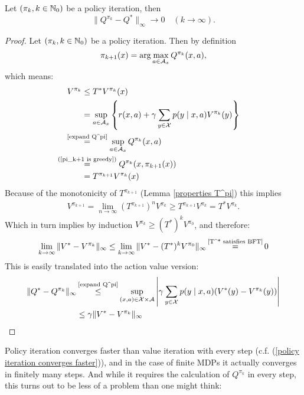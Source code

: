 \begin{prop}
	Let \((\pi_k,k\in\mathbb{N}_0)\) be a policy iteration, then
	\[\|Q^{\pi_k}-Q^*\|_\infty \to 0 \quad (k\to\infty). \] 
\end{prop}
\begin{proof}
	Let \((\pi_k,k\in\mathbb{N}_0)\) be a policy iteration. Then by definition
	\begin{align}\label{pi_k+1 is greedy}
		\pi_{k+1}(x)=\arg\max_{a\in\mathcal{A}_x} Q^{\pi_k}(x,a),
	\end{align}
	which means:
	\begin{align}
		V^{\pi_k} &\le T^* V^{\pi_k}(x)
		\label{real improvement or optimal}\\
		&=\sup_{a\in\cA_x}\left\{r(x,a)+\gamma \sum_{y\in\cX}p(y\mid x,a)V^{\pi_k}(y) \right\}
		\nonumber\\
		&\lxeq{\text{\ref{expand Q^pi}}}\sup_{a\in\cA_x}Q^{\pi_k}(x,a)
		\nonumber\\
		&\lxeq{\text{(\ref{pi_k+1 is greedy})} }Q^{\pi_k}(x,\pi_{k+1}(x))
		\nonumber\\
		&=T^{\pi_{k+1}}V^{\pi_k}(x)
		\nonumber
	\end{align}
	Because of the monotonicity of \(T^{\pi_{k+1}}\) (Lemma \ref{properties T^pi}) this implies
	\begin{align}\label{policy iteration converges faster}
		V^{\pi_{k+1}}=\lim_{n\to\infty}(T^{\pi_{k+1}})^n V^{\pi_k}
		\ge T^{\pi_{k+1}} V^{\pi_k} 
		= T^* V^{\pi_k}.
	\end{align}
	Which in turn implies by induction \(V^{\pi_{k}} \ge (T^*)^k V^{\pi_0}\), and therefore:
	\begin{align*}
		\lim_{k\to\infty} \|V^* - V^{\pi_k}\|_\infty 
		\le \lim_{k\to\infty} \|V^* - (T^*)^k V^{\pi_0}\|_\infty 
		\xeq{\text{\ref{T^* satisfies BFT}}} 0
	\end{align*}
	This is easily translated into the action value version:
	\begin{align*}
		\|Q^* - Q^{\pi_k}\|_\infty &\xlq{\text{\ref{expand Q^pi}}} \sup_{(x,a)\in\cX\times\cA} \left| 
			\gamma \sum_{y\in\cX}p(y\mid x,a) (V^*(y)- V^{\pi_k}(y))
		\right|\\
		&\le \gamma \| V^* -V^{\pi_k}\|_\infty \qedhere
	\end{align*}
\end{proof}  

Policy iteration converges faster than value iteration with every step 
(c.f. (\ref{policy iteration converges faster})), and in the case of finite MDPs it actually converges in finitely many steps. And while it requires the calculation of \(Q^{\pi_k}\) in every step, this turns out to be less of a problem than one might think:

